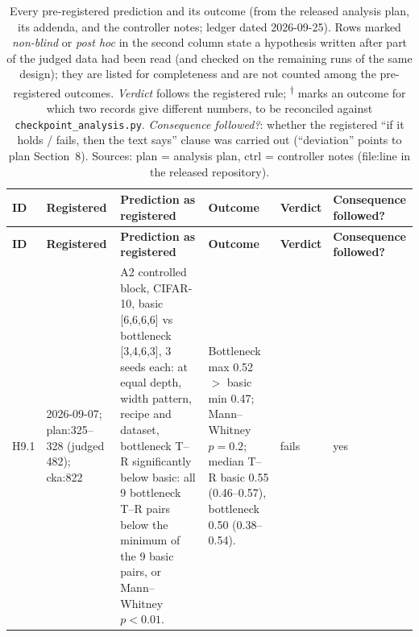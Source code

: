 \begin{longtable}{p{1.1cm}p{1.4cm}p{6.2cm}p{4.6cm}p{2.0cm}p{1.6cm}}
\caption{Every pre-registered prediction and its outcome (from the released analysis plan, its
addenda, and the controller notes; ledger dated 2026-09-25). Rows marked \emph{non-blind} or \emph{post hoc} in the second column state a hypothesis written after part of the judged data had been read (and checked on the remaining runs of the same design); they are listed for completeness and are not counted among the pre-registered outcomes. \emph{Verdict} follows the registered
rule; \textsuperscript{$\dagger$} marks an outcome for which two records give different numbers, to be
reconciled against \texttt{checkpoint\_analysis.py}. \emph{Consequence followed?}: whether the registered
``if it holds / fails, then the text says'' clause was carried out (``deviation'' points to plan
Section~8). Sources: plan = analysis plan, ctrl = controller notes (file:line in the released repository).}\label{tab:sprereg}\\
\toprule
\textbf{ID} & \textbf{Regis\-tered} & \textbf{Prediction as registered} & \textbf{Outcome} & \textbf{Verdict} & \textbf{Conse\-quence followed?} \\
\midrule
\endfirsthead
\toprule
\textbf{ID} & \textbf{Regis\-tered} & \textbf{Prediction as registered} & \textbf{Outcome} & \textbf{Verdict} & \textbf{Conse\-quence followed?} \\
\midrule
\endhead
H9.1 & 2026-09-07; plan:325--328 (judged 482); cka:822 & A2 controlled block, CIFAR-10, basic [6,6,6,6] vs bottleneck [3,4,6,3], 3 seeds each: at equal depth, width pattern, recipe and dataset, bottleneck T--R significantly below basic: all 9 bottleneck T--R pairs below the minimum of the 9 basic pairs, or Mann--Whitney $p<0.01$. & Bottleneck max 0.52 $>$ basic min 0.47; Mann--Whitney $p=0.2$; median T--R basic 0.55 (0.46--0.57), bottleneck 0.50 (0.38--0.54). & fails & yes \\

\end{longtable}
